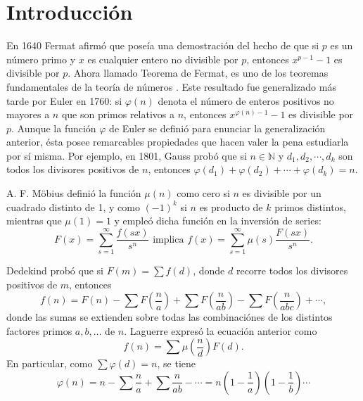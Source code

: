\section*{Introducción}

En 1640 Fermat afirmó que poseía una demostración del hecho de que si $p$ es un número primo y $x$ es cualquier entero no divisible por $p$, entonces $x^{p-1}-1$ es divisible por $p$. Ahora llamado Teorema de Fermat, es uno de los teoremas fundamentales de la teoría de números \cite{Di1}. Este resultado fue generalizado más tarde por Euler en 1760: si $\varphi(n)$ denota el número de enteros positivos no mayores a $n$ que son primos relativos a $n$, entonces $x^{\varphi(n)-1}-1$ es divisible por $p$.
Aunque la función $\varphi$ de Euler se definió para enunciar la generalización anterior, ésta posee remarcables propiedades que hacen valer la pena estudiarla por sí misma. Por ejemplo, en 1801, Gauss probó que si $n\in\mathbb{N}$ y $d_1,d_2,\cdots,d_k$ son todos los divisores positivos de $n$, entonces $\varphi(d_1)+\varphi(d_2)+\cdots+\varphi(d_k)=n$.
\bigskip

A. F. Möbius definió la función $\mu(n)$ como cero si $n$ es divisible por un cuadrado distinto de 1, y como $(-1)^k$ si $n$ es producto de $k$ primos distintos, mientras que $\mu(1)=1$ y empleó dicha función en la inversión de series:
\begin{equation*}
    F(x) = \sum_{s=1}^{\infty} \frac{f(s x)}{s^n} \text{ implica } f(x) = \sum_{s=1}^{\infty} \mu(s) \frac{F(s x)}{s^n}.
\end{equation*}

Dedekind probó que si $F(m) = \sum f(d)$, donde $d$ recorre todos los divisores positivos de $m$, entonces
\begin{equation*}
    f(n) = F(n) - \sum F \left( \frac{n}{a} \right) + \sum F \left(  \frac{n}{a b} \right) - \sum F \left( \frac{n}{a b c} \right) + \cdots,
\end{equation*}
donde las sumas se extienden sobre todas las combinaciónes de los distintos factores primos $a, b, \ldots$ de $n$. Laguerre expresó la ecuación anterior como
\begin{equation*}
    f(n) = \sum \mu \left(  \frac{n}{d} \right) F(d).
\end{equation*}
En particular, como $\sum \varphi(d) = n$, se tiene
\begin{equation*}
    \varphi(n) = n - \sum \frac{n}{a} + \sum \frac{n}{a b} - \cdots = n \left( 1 - \frac{1}{a} \right) \left( 1 - \frac{1}{b} \right) \cdots
\end{equation*}

